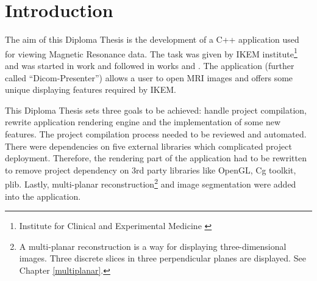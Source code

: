 \chapter{Introduction}
\vspace{-10mm}
The aim of this Diploma Thesis is the development of a C++ application used for viewing Magnetic Resonance data. The task was given by IKEM institute\footnote{Institute for Clinical and Experimental Medicine \cite{ikem}} and was started in work \cite{neskudla} and followed in works \cite{flaska_bc} and \cite{flaska_vu}. The application (further called ``Dicom-Presenter'') allows a user to open MRI images and offers some unique displaying features required by IKEM.

This Diploma Thesis sets three goals to be achieved: handle project compilation, rewrite application rendering engine and the implementation of some new features. The project compilation process needed to be reviewed and automated. There were dependencies on five external libraries which complicated project deployment. Therefore, the rendering part of the application had to be rewritten to remove project dependency on 3rd party libraries like OpenGL, Cg toolkit, plib. Lastly, multi-planar reconstruction\footnote{A multi-planar reconstruction is a way for displaying three-dimensional images. Three discrete slices in three perpendicular planes are displayed. See Chapter \ref{multiplanar}.} and image segmentation were added into the application.
